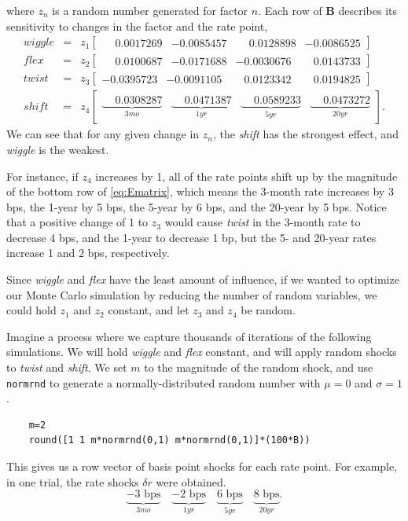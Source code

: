 \documentclass[11pt,twoside]{article}
\numberwithin{equation}{section}
\begin{document}
where $z_n$ is a random number generated for factor $n$. Each row of $\mathbf{B}$ describes its sensitivity to changes in the factor and the rate point,
\begin{eqnarray*}
wiggle &=& z_1 
\begin{bmatrix}
\phantom{-}0.0017269 & -0.0085457 & \phantom{-}0.0128898 & -0.0086525
\end{bmatrix}\\
flex &=& z_2
\begin{bmatrix}
\phantom{-}0.0100687 & -0.0171688 & -0.0030676 & \phantom{-}0.0143733
\end{bmatrix} \\
twist &=& z_3
\begin{bmatrix}
-0.0395723 & -0.0091105 & \phantom{-}0.0123342 & \phantom{-}0.0194825
\end{bmatrix} \\
shift &=& z_4
\begin{bmatrix}
\underbrace{\phantom{-}0.0308287}_{3mo} & \underbrace{\phantom{-}0.0471387}_{1yr} & \underbrace{\phantom{-}0.0589233}_{5yr} & \underbrace{\phantom{-}0.0473272}_{20yr}
\end{bmatrix}.
\end{eqnarray*}
We can see that for any given change in $z_n$, the \emph{shift} has the strongest effect, and \emph{wiggle} is the weakest.

For instance, if $z_4$ increases by 1, all of the rate points shift up by the magnitude of the bottom row of \eqref{eq:Ematrix}, which means the 3-month rate increases by 3 bps, the 1-year by 5 bps, the 5-year by 6 bps, and the 20-year by 5 bps. Notice that a positive change of 1 to $z_3$ would cause \emph{twist} in the 3-month rate to decrease 4 bps, and the 1-year to decrease 1 bp, but the 5- and 20-year rates increase 1 and 2 bps, respectively.

Since \emph{wiggle} and \emph{flex} have the least amount of influence, if we wanted to optimize our Monte Carlo simulation by reducing the number of random variables, we could hold $z_1$ and $z_2$ constant, and let $z_3$ and $z_4$ be random.

Imagine a process where we capture thousands of iterations of the following simulations. We will hold \emph{wiggle} and \emph{flex} constant, and will apply random shocks to \emph{twist} and \emph{shift}. We set $m$ to the magnitude of the random shock, and use \texttt{normrnd} to generate a normally-distributed random number with $\mu=0$ and $\sigma=1$.
\begin{verbatim}
    m=2
    round([1 1 m*normrnd(0,1) m*normrnd(0,1)]*(100*B))
\end{verbatim}
This gives us a row vector of basis point shocks for each rate point. For example, in one trial, the rate shocks $\delta r$ were obtained.
\[
\underbrace{-3 \text{ bps}}_{3mo} \quad \underbrace{-2 \text{ bps}}_{1yr} \quad \underbrace{6 \text{ bps}}_{5yr} \quad \underbrace{8 \text{ bps}}_{20yr}.
\]


%
%
\end{document}

